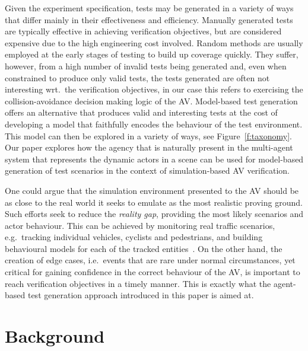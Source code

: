 \documentclass[letterpaper, 10 pt, journal, twoside]{IEEEtran}
\begin{document}
%
Given the experiment specification, tests may be generated in a variety of ways that differ mainly in their effectiveness and efficiency. 
%
Manually generated tests are typically effective in achieving verification objectives, but are considered expensive due to the high engineering cost involved. 
%
Random methods are usually employed at the early stages of testing to build up coverage quickly. They suffer, however, from a high number of invalid tests being generated and, even when constrained to produce only valid tests, the tests generated are often not interesting wrt.\ the verification objectives, in our case this refers to exercising the collision-avoidance decision making logic of the AV. 
%
Model-based test generation offers an alternative that produces valid and interesting tests at the cost of developing a model that faithfully encodes the behaviour of the test environment. This model can then be explored in a variety of ways, see Figure~\ref{f:taxonomy}.
%
Our paper explores how the agency that is naturally present in the multi-agent system that represents the dynamic actors in a scene can be used for model-based generation of test scenarios in the context of simulation-based AV verification. 

One could argue that the simulation environment presented to the AV should be as close to the real world it seeks to emulate as the most realistic proving ground. Such efforts seek to reduce the \textit{reality gap}, %
providing the most likely scenarios and actor behaviour. This can be achieved by monitoring real traffic scenarios, e.g.\ tracking individual vehicles, cyclists and pedestrians, and building behavioural models for each of the tracked entities~\cite{behbahani2019learning}.
%
On the other hand, the creation of edge cases, i.e.\ events that are rare under normal circumstances, yet critical for gaining confidence in the correct behaviour of the AV, is important to reach verification objectives in a timely manner.
%
This is exactly what the agent-based test generation approach introduced in this paper is aimed at.  


\section{Background}\label{s:background}

\end{document}
